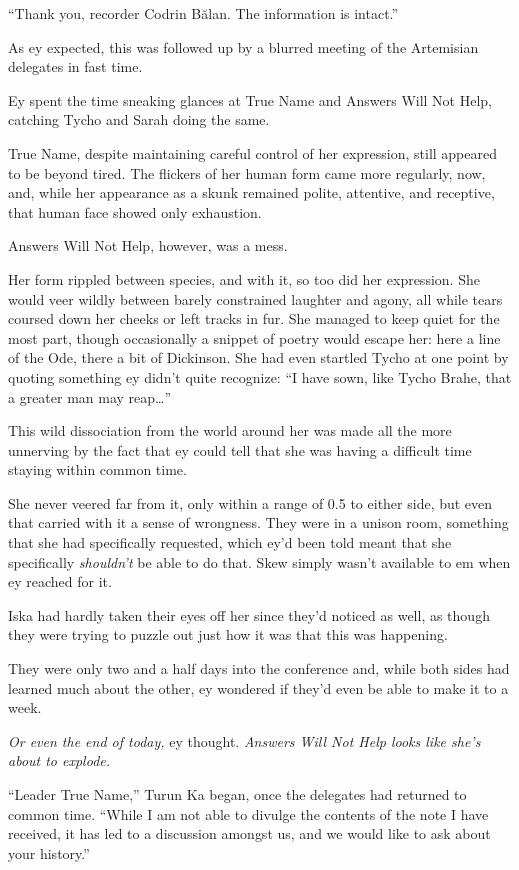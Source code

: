 ``Thank you, recorder Codrin Bălan. The information is intact.''

As ey expected, this was followed up by a blurred meeting of the Artemisian delegates in fast time.

Ey spent the time sneaking glances at True Name and Answers Will Not Help, catching Tycho and Sarah doing the same.

True Name, despite maintaining careful control of her expression, still appeared to be beyond tired. The flickers of her human form came more regularly, now, and, while her appearance as a skunk remained polite, attentive, and receptive, that human face showed only exhaustion.

Answers Will Not Help, however, was a mess.

Her form rippled between species, and with it, so too did her expression. She would veer wildly between barely constrained laughter and agony, all while tears coursed down her cheeks or left tracks in fur. She managed to keep quiet for the most part, though occasionally a snippet of poetry would escape her: here a line of the Ode, there a bit of Dickinson. She had even startled Tycho at one point by quoting something ey didn't quite recognize: ``I have sown, like Tycho Brahe, that a greater man may reap\ldots{}''

This wild dissociation from the world around her was made all the more unnerving by the fact that ey could tell that she was having a difficult time staying within common time.

She never veered far from it, only within a range of 0.5 to either side, but even that carried with it a sense of wrongness. They were in a unison room, something that she had specifically requested, which ey'd been told meant that she specifically \emph{shouldn't} be able to do that. Skew simply wasn't available to em when ey reached for it.

Iska had hardly taken their eyes off her since they'd noticed as well, as though they were trying to puzzle out just how it was that this was happening.

They were only two and a half days into the conference and, while both sides had learned much about the other, ey wondered if they'd even be able to make it to a week.

\emph{Or even the end of today,} ey thought. \emph{Answers Will Not Help looks like she's about to explode.}

``Leader True Name,'' Turun Ka began, once the delegates had returned to common time. ``While I am not able to divulge the contents of the note I have received, it has led to a discussion amongst us, and we would like to ask about your history.''

